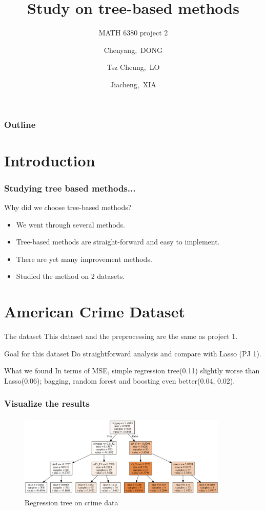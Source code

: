 \documentclass{beamer}
\title[MATH 6380 Project 2]{Study on tree-based methods}
\subtitle{MATH 6380 project 2}
\author[C.Dong, T.C.LO, J.Xia]
{Chenyang,~DONG \and Tsz Cheung,~LO \and Jiacheng,~XIA}
\begin{document}
\frame{\titlepage}

\begin{frame}
\frametitle{Outline}
\tableofcontents
\end{frame}

\section{Introduction}
\begin{frame}
\frametitle{Studying tree based methods...}
Why did we choose tree-based methods?
\pause
\begin{itemize}
\item We went through several methods.
\pause
\item Tree-based methods are straight-forward and easy to implement.
\pause
\item There are yet many improvement methods.
\pause
\item Studied the method on 2 datasets.
\end{itemize}
\end{frame}


\section{American Crime Dataset}
\begin{frame}
\begin{block}{The dataset}
This dataset and the preprocessing are the same as project 1.
\end{block}
\pause
\begin{exampleblock}{Goal for this dataset}
Do straightforward analysis and compare with Lasso (PJ 1).
\end{exampleblock}
\begin{alertblock}{What we found}
In terms of MSE, simple regression tree(0.11) slightly worse than Lasso(0.06); bagging, random forest and boosting even better(0.04, 0.02).
\end{alertblock}
\end{frame}

\begin{frame}
\frametitle{Visualize the results}
\begin{figure}[h]
  \centering
  \includegraphics[width=10cm, height=4cm]{crime_treetu}
  \caption{Regression tree on crime data}
\end{figure}
\end{frame}
\end{document}
